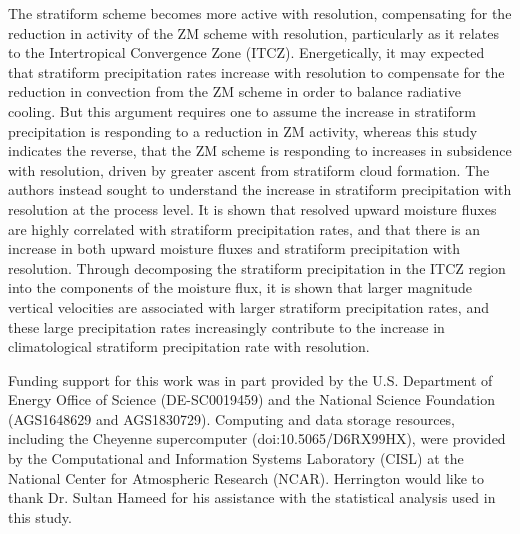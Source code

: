 \documentclass[times]{qjrms4}
\begin{document}
The stratiform scheme becomes more active with resolution, compensating for the reduction in activity of the ZM scheme with resolution, particularly as it relates to the Intertropical Convergence Zone (ITCZ). Energetically, it may expected that stratiform precipitation rates increase with resolution to compensate for the reduction in convection from the ZM scheme in order to balance radiative cooling. But this argument requires one to assume the increase in stratiform precipitation is responding to a reduction in ZM activity, whereas this study indicates the reverse, that the ZM scheme is responding to increases in subsidence with resolution, driven by greater ascent from stratiform cloud formation. The authors instead sought to understand the increase in stratiform precipitation with resolution at the process level. It is shown that resolved upward moisture fluxes are highly correlated with stratiform precipitation rates, and that there is an increase in both upward moisture fluxes and stratiform precipitation with resolution. Through decomposing the stratiform precipitation in the ITCZ region into the components of the moisture flux, it is shown that larger magnitude vertical velocities are associated with larger stratiform precipitation rates, and these large precipitation rates increasingly contribute to the increase in climatological stratiform precipitation rate with resolution.

{\color{red}{Wrap up with a closing paragraph}}

\ack 
Funding support for this work was in part provided by the U.S. Department of Energy Office of Science (DE-SC0019459) and the National Science Foundation (AGS1648629 and AGS1830729). Computing and data storage resources, including the Cheyenne supercomputer (doi:10.5065/D6RX99HX), were provided by the Computational and Information Systems Laboratory (CISL) at the National Center for Atmospheric Research (NCAR). Herrington would like to thank Dr. Sultan Hameed for his assistance with the statistical analysis used in this study.



\end{document}
